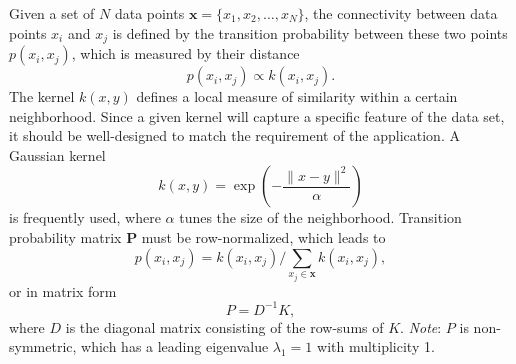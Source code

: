Given a set of $N$ data points $\mathbf{x}=\{x_1, x_2,\dots,x_N\}$, the connectivity between data points $x_i$ and $x_j$ is defined by the transition probability between these two points $p(x_i,x_j)$, which is measured by their distance
\begin{equation}
	p(x_i,x_j)\propto k(x_i,x_j).
\end{equation}
The kernel $k(x,y)$ defines a local measure of similarity within a certain neighborhood. Since a given kernel will capture a specific feature of the data set, it should be well-designed to match the requirement of the application. A Gaussian kernel
\begin{equation}
	k(x,y)=\exp{\left(-\frac{\lVert x-y\rVert^2}{\alpha}\right)}
\end{equation}
is frequently used, where $\alpha$ tunes the size of the neighborhood. Transition probability matrix $\mathbf{P}$ must be row-normalized, which leads to
\begin{equation}
	p(x_i,x_j)= k(x_i,x_j)/\sum\limits_{x_j\in \mathbf{x}}k(x_i,x_j),
\end{equation}
or in matrix form
\begin{equation}
	P=D^{-1}K,
\end{equation}
where $D$ is the diagonal matrix consisting of the row-sums of $K$. \textit{Note}: $P$ is non-symmetric, which has a leading eigenvalue $\lambda_1=1$ with multiplicity 1.
 

